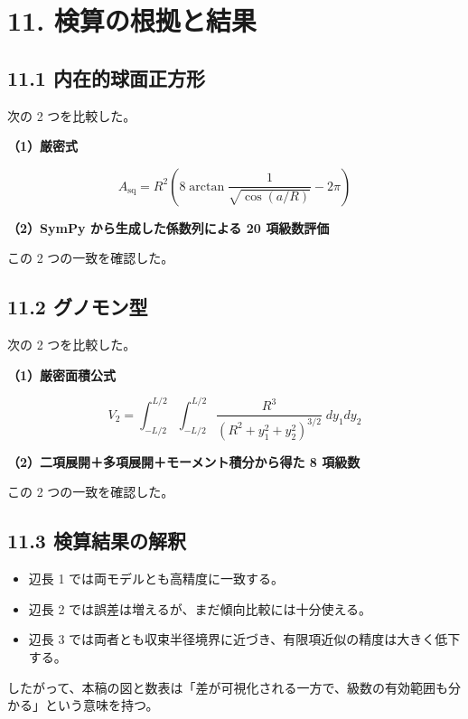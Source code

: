 \documentclass[
  12pt,
  a4paper,
]{article}
\providecommand{\tightlist}{%
  \setlength{\itemsep}{0pt}\setlength{\parskip}{0pt}}
\begin{document}
\section{11.
検算の根拠と結果}\label{ux691cux7b97ux306eux6839ux62e0ux3068ux7d50ux679c}

\subsection{11.1
内在的球面正方形}\label{ux5185ux5728ux7684ux7403ux9762ux6b63ux65b9ux5f62-3}

次の 2 つを比較した。

\textbf{（1）厳密式}

\[
A_{\mathrm{sq}} =
R^2\left(
8\arctan\frac{1}{\sqrt{\cos(a/R)}}-2\pi
\right)
\]

\textbf{（2）SymPy から生成した係数列による 20 項級数評価}

この 2 つの一致を確認した。

\subsection{11.2 グノモン型}\label{ux30b0ux30ceux30e2ux30f3ux578b-1}

次の 2 つを比較した。

\textbf{（1）厳密面積公式}

\[
V_2 =
\int_{-L/2}^{L/2}\int_{-L/2}^{L/2}
\frac{R^3}{(R^2+y_1^2+y_2^2)^{3/2}}
\;dy_1dy_2
\]

\textbf{（2）二項展開＋多項展開＋モーメント積分から得た 8 項級数}

この 2 つの一致を確認した。

\subsection{11.3
検算結果の解釈}\label{ux691cux7b97ux7d50ux679cux306eux89e3ux91c8}

\begin{itemize}
\tightlist
\item
  辺長 1 では両モデルとも高精度に一致する。
\item
  辺長 2 では誤差は増えるが、まだ傾向比較には十分使える。
\item
  辺長 3
  では両者とも収束半径境界に近づき、有限項近似の精度は大きく低下する。
\end{itemize}

したがって、本稿の図と数表は「差が可視化される一方で、級数の有効範囲も分かる」という意味を持つ。
\end{document}
